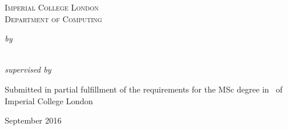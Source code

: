 \begin{titlepage}

\center

\textsc{\Large{Imperial College London}}\\[0.5cm] 
\textsc{\large{Department of Computing}}\\[0.5cm] 

\vspace{4cm}
\huge{\textbf{\reporttitle}}
\vspace{2cm}

\large{
  \emph{by} \\
  \vspace{0.1cm}
  \textbf{\name}\\
}

\vspace{1cm}


\large{
  \emph{supervised by} \\
  \vspace{0.1cm}
  \textbf{\supervisor}
}

\vfill %
\large{
Submitted in partial fulfillment of the requirements for the MSc degree in
\course~of Imperial College London\\[0.5cm]
}

\small{September 2016}

\end{titlepage}
